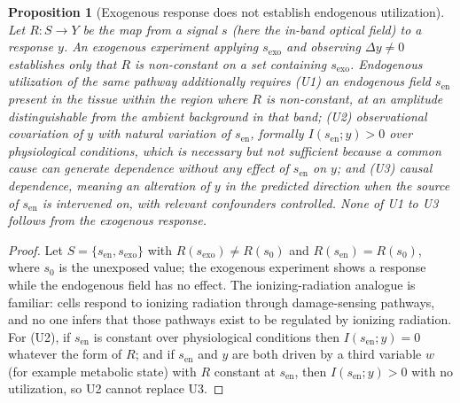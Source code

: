 \documentclass[11pt]{article}
\theoremstyle{plain}
\newtheorem{proposition}{Proposition}
\theoremstyle{definition}
\theoremstyle{remark}
\begin{document}
\begin{proposition}[Exogenous response does not establish endogenous utilization]
\label{prop:endo}
Let $R:S\to Y$ be the map from a signal $s$ (here the in-band optical field) to a response $y$. An exogenous experiment applying $s_{\mathrm{exo}}$ and observing $\Delta y\ne0$ establishes only that $R$ is non-constant on a set containing $s_{\mathrm{exo}}$. Endogenous utilization of the same pathway additionally requires (U1) an endogenous field $s_{\mathrm{en}}$ present in the tissue within the region where $R$ is non-constant, at an amplitude distinguishable from the ambient background in that band; (U2) observational covariation of $y$ with natural variation of $s_{\mathrm{en}}$, formally $I(s_{\mathrm{en}};y)>0$ over physiological conditions, which is necessary but not sufficient because a common cause can generate dependence without any effect of $s_{\mathrm{en}}$ on $y$; and (U3) causal dependence, meaning an alteration of $y$ in the predicted direction when the source of $s_{\mathrm{en}}$ is intervened on, with relevant confounders controlled. None of U1 to U3 follows from the exogenous response.
\end{proposition}

\begin{proof}
Let $S=\{s_{\mathrm{en}},s_{\mathrm{exo}}\}$ with $R(s_{\mathrm{exo}})\ne R(s_0)$ and $R(s_{\mathrm{en}})=R(s_0)$, where $s_0$ is the unexposed value; the exogenous experiment shows a response while the endogenous field has no effect. The ionizing-radiation analogue is familiar: cells respond to ionizing radiation through damage-sensing pathways, and no one infers that those pathways exist to be regulated by ionizing radiation. For (U2), if $s_{\mathrm{en}}$ is constant over physiological conditions then $I(s_{\mathrm{en}};y)=0$ whatever the form of $R$; and if $s_{\mathrm{en}}$ and $y$ are both driven by a third variable $w$ (for example metabolic state) with $R$ constant at $s_{\mathrm{en}}$, then $I(s_{\mathrm{en}};y)>0$ with no utilization, so U2 cannot replace U3.
\end{proof}
\end{document}
